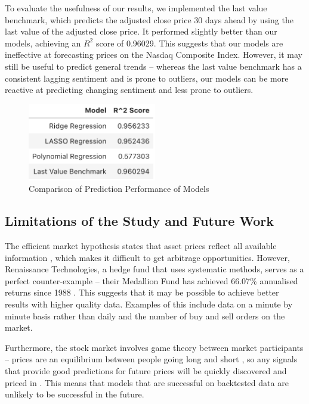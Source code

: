 \documentclass[a4paper, 11pt]{article}
\begin{document}
To evaluate the usefulness of our results, we implemented the last value benchmark, which predicts the adjusted close price 30 days ahead by using the last value of the adjusted close price. It performed slightly better than our models, achieving an $R^2$ score of 0.96029. This suggests that our models are ineffective at forecasting prices on the Nasdaq Composite Index. However, it may still be useful to predict general trends -- whereas the last value benchmark has a consistent lagging sentiment and is prone to outliers, our models can be more reactive at predicting changing sentiment and less prone to outliers.

\begin{figure}[H]
    \begin{center}
        \includegraphics[width=0.5\textwidth]{Model Results Table.png}
        \caption{Comparison of Prediction Performance of Models}
    \end{center}
\end{figure}

\subsection{Limitations of the Study and Future Work}
The efficient market hypothesis states that asset prices reflect all available information \cite{fama1970efficient}, which makes it difficult to get arbitrage opportunities. However, Renaissance Technologies, a hedge fund that uses systematic methods, serves as a perfect counter-example -- their Medallion Fund has achieved 66.07\% annualised returns since 1988 \cite{cornell2020medallion}. This suggests that it may be possible to achieve better results with higher quality data. Examples of this include data on a minute by minute basis rather than daily and the number of buy and sell orders on the market.

Furthermore, the stock market involves game theory between market participants \cite{allen1998finance} -- prices are an equilibrium between people going long and short \cite{thakor1991game}, so any signals that provide good predictions for future prices will be quickly discovered and priced in \cite{carfi2011fair}. This means that models that are successful on backtested data are unlikely to be successful in the future.
\end{document}
